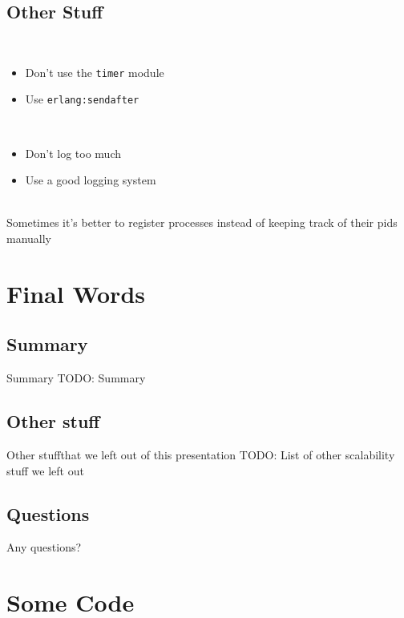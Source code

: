 \documentclass[utf8]{beamer}
\begin{document}
\subsection{Other Stuff}
\begin{frame}
	\begin{description}
		\item<+->[Timers]\ \\
			\begin{itemize}
				\item Don't use the \texttt{timer} module
				\item Use \texttt{erlang:send\textunderscore after}
			\end{itemize}
		\item<+->[Logging]\ \\
			\begin{itemize}
				\item Don't log too much
				\item Use a good logging system
			\end{itemize}
		\item<+->[Registration]\ \\
			Sometimes it's better to register processes instead of keeping track of their pids manually
	\end{description}
\end{frame}

\section{Final Words}
\subsection{Summary}
\begin{frame}{Summary}
	TODO: Summary
\end{frame}
\subsection{Other stuff}
\begin{frame}{Other stuff}{that we left out of this presentation}
	TODO: List of other scalability stuff we left out
\end{frame}
\subsection{Questions}
\begin{frame}
	\alert{Any questions?}
\end{frame}

\appendix

\lstset{language=erlang}

\section{Some Code}
\begin{frame}
\mycode
\end{frame}
\end{document}
